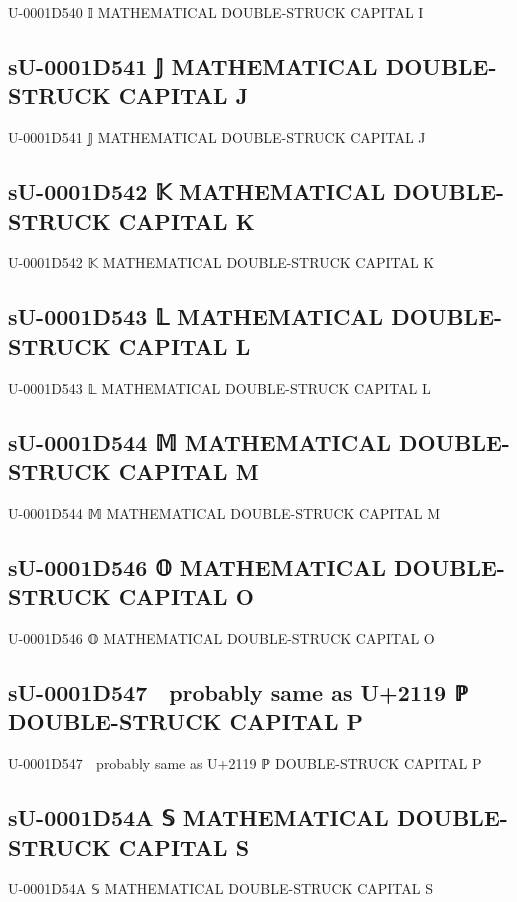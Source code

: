 U-0001D540 𝕀 MATHEMATICAL DOUBLE-STRUCK CAPITAL I

\subsection{sU-0001D541 𝕁 MATHEMATICAL DOUBLE-STRUCK CAPITAL J}

U-0001D541 𝕁 MATHEMATICAL DOUBLE-STRUCK CAPITAL J

\subsection{sU-0001D542 𝕂 MATHEMATICAL DOUBLE-STRUCK CAPITAL K}

U-0001D542 𝕂 MATHEMATICAL DOUBLE-STRUCK CAPITAL K

\subsection{sU-0001D543 𝕃 MATHEMATICAL DOUBLE-STRUCK CAPITAL L}

U-0001D543 𝕃 MATHEMATICAL DOUBLE-STRUCK CAPITAL L

\subsection{sU-0001D544 𝕄 MATHEMATICAL DOUBLE-STRUCK CAPITAL M}

U-0001D544 𝕄 MATHEMATICAL DOUBLE-STRUCK CAPITAL M

\subsection{sU-0001D546 𝕆 MATHEMATICAL DOUBLE-STRUCK CAPITAL O}

U-0001D546 𝕆 MATHEMATICAL DOUBLE-STRUCK CAPITAL O

\subsection{sU-0001D547 𝕇 probably same as U+2119 ℙ DOUBLE-STRUCK CAPITAL P}

U-0001D547 𝕇 probably same as U+2119 ℙ DOUBLE-STRUCK CAPITAL P

\subsection{sU-0001D54A 𝕊 MATHEMATICAL DOUBLE-STRUCK CAPITAL S}

U-0001D54A 𝕊 MATHEMATICAL DOUBLE-STRUCK CAPITAL S

